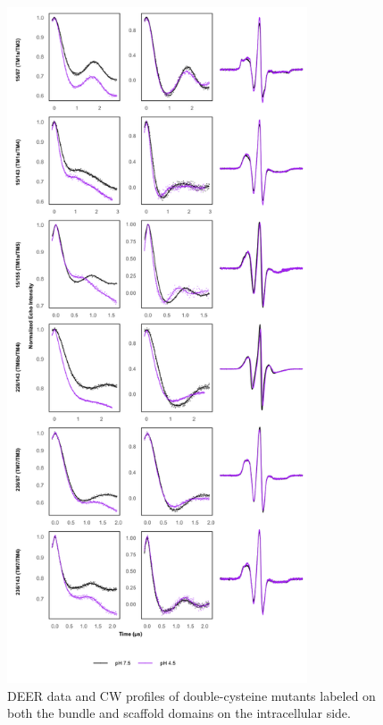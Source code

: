 \begin{figure}[h]
\centering
\includegraphics[width=3.5in]{Figures/gadc_supp_bundle_hash_intra.pdf}
\caption[DEER data and CW profiles of double-cysteine mutants labeled on both the bundle and scaffold domains on the intracellular side.]{DEER data and CW profiles of double-cysteine mutants labeled on both the bundle and scaffold domains on the intracellular side.}
\label{fig:gadc_supp_bundle_hash_intra}
\end{figure}


